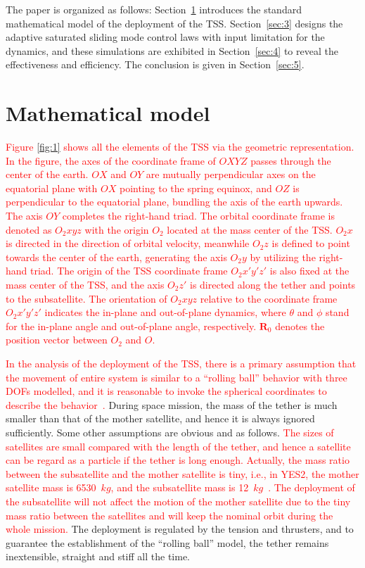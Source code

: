 \documentclass[3p]{elsarticle}
\theoremstyle{plain}
\theoremstyle{remark}
\begin{document}
The paper is organized as follows: Section~\ref{sec:2} introduces the standard mathematical model of the deployment of the TSS. Section~\ref{sec:3} designs the adaptive saturated sliding mode control laws with input limitation for the dynamics, and these simulations are exhibited in Section~\ref{sec:4} to reveal the effectiveness and efficiency. The conclusion is given in Section~\ref{sec:5}.
\section{Mathematical model}\label{sec:2}
\textcolor{red}{Figure \ref{fig:1} shows all the elements of the TSS via the geometric representation. In the figure, the axes of the coordinate frame of $OXYZ$ passes through the center of the earth. $OX$ and $OY$ are mutually perpendicular axes on the equatorial plane with $OX$ pointing to the spring equinox, and $OZ$ is perpendicular to the equatorial plane, bundling the axis of the earth upwards. The axis $OY$ completes the right-hand triad. The orbital coordinate frame is denoted as $O_2xyz$ with the origin $O_2$ located at the mass center of the TSS. $O_2x$ is directed in the direction of orbital velocity, meanwhile $O_2z$ is defined to point towards the center of the earth, generating the axis $O_2y$ by utilizing the right-hand triad. The origin of the TSS coordinate frame $O_2x'y'z'$ is also fixed at the mass center of the TSS, and the axis $O_2z'$ is directed along the tether and points to the subsatellite. The orientation of $O_2xyz$ relative to the coordinate frame $O_2x'y'z'$ indicates the in-plane and out-of-plane dynamics, where $\theta$ and $\phi$ stand for the in-plane angle and out-of-plane angle, respectively. $\bm R_0$ denotes the position vector between $O_2$ and $O$.}\par
\textcolor{red}{In the analysis of the deployment of the TSS, there is a primary assumption that the movement of entire system is similar to a ``rolling ball'' behavior with three DOFs modelled, and it is reasonable to invoke the spherical coordinates to describe the behavior~\cite{Williams2008}.} During space mission, the mass of the tether is much smaller than that of the mother satellite, and hence it is always ignored sufficiently. Some other assumptions are obvious and as follows. \textcolor{red}{The sizes of satellites are small compared with the length of the tether, and hence a satellite can be regard as a particle if the tether is long enough. Actually, the mass ratio between the subsatellite and the mother satellite is tiny, i.e., in YES2, the mother satellite mass is 6530~$kg$, and the subsatellite mass is 12~$kg$~\cite{Williams2008}. The deployment of the subsatellite will not affect the motion of the mother satellite due to the tiny mass ratio between the satellites and will keep the nominal orbit during the whole mission.} The deployment is regulated by the tension and thrusters, and to guarantee the establishment of the ``rolling ball'' model, the tether remains inextensible, straight and stiff all the time.\par
\end{document}
